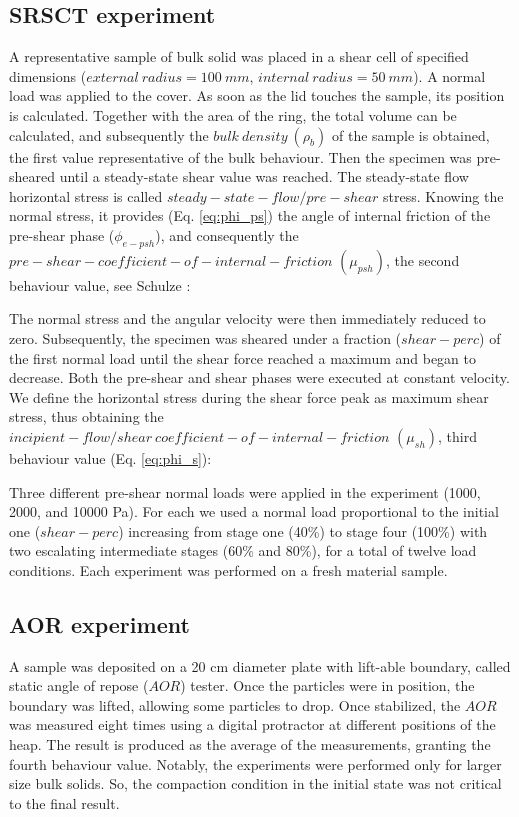 \begin{appendix}
\subsection{SRSCT experiment}
\label{subsec:srsctexperiment}
A representative sample of bulk solid was placed in a shear cell of specified
dimensions ($external ~ radius = 100 ~ mm$, $internal ~ radius = 50 ~ mm$).
A normal load was applied to the cover. As soon as the lid touches the sample, its position is calculated.
Together with the area of the ring, the total volume can be calculated, and subsequently the $bulk ~ density ~ (\rho_b)$ 
of the sample is obtained, the first value representative of the bulk behaviour.
Then the specimen was pre-sheared until a steady-state shear value was reached.
The steady-state flow horizontal stress
is called $steady-state-flow/pre-shear$ stress.
Knowing the normal stress, it provides (Eq. \ref{eq:phi_ps}) the angle of
internal friction of the pre-shear phase ($\phi_{e-psh}$), and consequently the
$pre-shear-coefficient-of-internal-friction $ $ (\mu_{psh})$, the second
behaviour value, see Schulze \cite{RefWorks:118}:
   
The normal stress and the angular velocity were then immediately reduced to zero. 
Subsequently, the specimen was sheared under a fraction ($shear-perc$) of the first normal load until the shear force 
reached a maximum and began to decrease. 
Both the pre-shear and shear phases were executed at constant velocity. 
We define the horizontal stress during the shear force peak as maximum shear stress, 
thus obtaining the $incipient-flow/shear ~ coefficient-of-internal-friction $ $
(\mu_{sh})$, third behaviour value (Eq. \ref{eq:phi_s})\cite{RefWorks:118}:
 
Three different pre-shear normal loads were applied in the experiment
(1000, 2000, and 10000 Pa).
For each we used a normal load proportional to the initial one ($shear-perc$) increasing from stage one (40\%) 
to stage four (100\%) with two escalating intermediate stages (60\% and 80\%),
for a total of twelve load conditions.
Each experiment was performed on a fresh material sample. \\

\subsection{AOR experiment}
\label{subsec:aorexperiment}
A sample was deposited on a 20 cm diameter plate with lift-able boundary, called
static angle of repose ($AOR$) tester.
Once the particles were in position, the boundary was lifted, allowing some particles to drop. 
Once stabilized, the $AOR$ was measured eight times using a digital protractor at different positions of the heap. 
The result is produced as the average of the measurements, granting the fourth
behaviour value.
Notably, the experiments were performed only for larger size bulk solids. 
So, the compaction condition in the initial state was not critical to the final result.






\end{appendix}